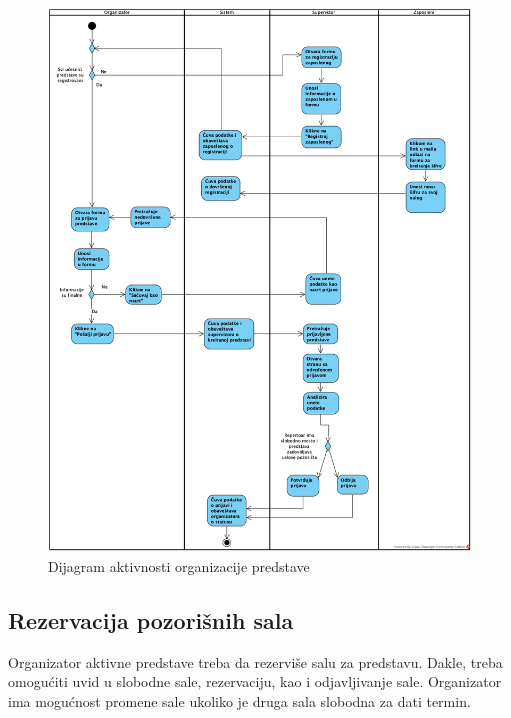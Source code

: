 \documentclass[a4paper]{article}
\begin{document}
\begin{figure}[H]
  \begin{center}
      \includegraphics[width=160mm]{../images/dijagram aktivnosti organizacija predstave vert.png}
  \end{center}
  \caption{Dijagram aktivnosti organizacije predstave}
  \label{da_organizacije_predstave}
\end{figure}



\subsection{Rezervacija pozorišnih sala}
Organizator aktivne predstave treba da rezerviše salu za predstavu. Dakle, treba omogućiti uvid u slobodne sale, rezervaciju, kao i odjavljivanje sale. Organizator ima mogućnost promene sale ukoliko je druga sala slobodna za dati termin.  
\end{document}
